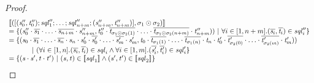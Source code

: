 \documentclass[numbers,10pt,preprint\ifanon ,nocopyrightspace\fi]{sigplanconf}
\begin{document}
\begin{proof}
  \[
    \begin{array}{l}
      [ \! [([(\mathit{s}_0'',\mathit{t}_0'');\mathit{sql}_1'';
      \ldots;
      \mathit{sql}_{n+m}'';(\mathit{s}_{n+m}'',\mathit{t}_{n+m}'')],
      \sigma_1\odot\sigma_2)] \! ]\\
      = \{(\mathit{s}_0''\cdot\overline{\mathit{s}_1}\cdot
      \ldots\cdot\overline{\mathit{s}_{n+m}}\cdot\mathit{s}_{n+m}'',
      \mathit{t}_0''\cdot\overline{\mathit{t}_{\sigma_1\odot\sigma_2(1)}}\cdot
      \ldots\cdot\overline{\mathit{t}_{\sigma_1\odot\sigma_2(n+m)}}\cdot\mathit{t}_{n+m}''))~|~
      \forall i\in[1,n+m].(\overline{\mathit{s}_i},\overline{\mathit{t}_i})\in\mathit{sql}_i''\}\\
      = \{(\mathit{s}_0\cdot\overline{\mathit{s}_1}\cdot\ldots\cdot
      \overline{\mathit{s}_n}\cdot\mathit{s}_n\cdot\mathit{s}_0'\cdot\overline{\mathit{s}_{0}'}\cdot
      \ldots\cdot\overline{\mathit{s}_m'}\cdot\mathit{s}_m',
      \mathit{t}_0\cdot\overline{\mathit{t}_{\sigma_1(1)}}\cdot\ldots\cdot
      \overline{\mathit{t}_{\sigma_1(n)}}\cdot\mathit{t}_n\cdot\mathit{t}_0'
      \cdot\overline{\mathit{t}_{\sigma_2(0)}'}\cdot
      \ldots\cdot\overline{\mathit{t}_{\sigma_2(m)}'}\cdot\mathit{t}_m'))\\
      \hspace*{3em}~|~
      (\forall i\in[1,n].
      (\overline{\mathit{s}_i},\overline{\mathit{t}_i})\in\mathit{sql}_i
      \wedge
      \forall i\in[1,m].
      (\overline{\mathit{s}_i'},\overline{\mathit{t}_i'})\in\mathit{sql}_i'\}\\
      = \{(\mathit{s}\cdot\mathit{s}',\mathit{t}\cdot\mathit{t}')~|~
      (\mathit{s},\mathit{t})\in[ \! [\mathit{sql}_1] \! ]
      \wedge
      (\mathit{s}',\mathit{t}')\in[ \! [\mathit{sql}_2] \! ]\}
    \end{array}
  \]

\end{proof}
\end{document}
